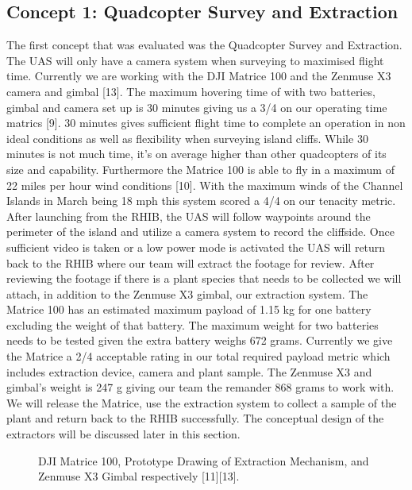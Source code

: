 \documentclass{wrcecapstone}
\begin{document}
\subsection{Concept 1: Quadcopter Survey and Extraction}
The first concept that was evaluated was the Quadcopter Survey and Extraction. The UAS will only have a camera system when surveying to maximised flight time. Currently we are working with the DJI Matrice 100 and the Zenmuse X3 camera and gimbal [13].  The maximum hovering time of with two batteries, gimbal and camera set up is 30 minutes giving us a 3/4 on our operating time matrics [9]. 30 minutes gives sufficient flight time to complete an operation in non ideal conditions as well as flexibility when surveying island cliffs. While 30 minutes is not much time, it's on average higher than other quadcopters of its size and capability. Furthermore the Matrice 100 is able to fly in a maximum of 22 miles per hour wind conditions [10].
With the maximum winds of the Channel Islands in March being 18 mph this system scored a 4/4 on our tenacity metric.  After launching from the RHIB, the UAS will follow waypoints around the perimeter of the island and utilize a camera system to record the cliffside. Once sufficient video is taken or a low power mode is activated the UAS will return back to the RHIB where our team will extract the footage for review.  After reviewing the footage if there is a plant species that needs to be collected we will attach, in addition to the Zenmuse X3 gimbal, our extraction system. 
The Matrice 100 has an estimated maximum payload of 1.15 kg for one battery excluding the weight of that battery. The maximum weight for two batteries needs to be tested given the extra battery weighs 672 grams. Currently we give the Matrice a  2/4 acceptable rating in our total required payload metric which includes extraction device, camera and plant sample. The Zenmuse X3 and gimbal’s weight is 247 g giving our team the remander 868 grams to work with. We will release the Matrice, use the extraction system to collect a sample of the plant and return back to the RHIB successfully. The conceptual design of the extractors will be discussed later in this section.  
\begin{figure}
\caption{DJI Matrice 100, Prototype Drawing of Extraction Mechanism, and Zenmuse X3 Gimbal respectively [11][13].}
\end{figure}
\end{document}
